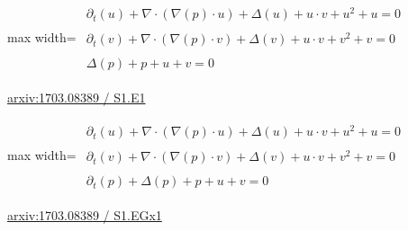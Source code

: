 \documentclass[UTF8,10pt,a4paper,fontset=mac]{ctexart}
\begin{document}
\begin{minipage}{\linewidth}\begin{center}\begin{adjustbox}{max width=\linewidth}$\displaystyle\begin{gathered}\begin{gathered}\partial_{t}(u)+\nabla\cdot(\nabla(p)\cdot u)+\Delta(u)+u\cdot v+u^{2}+u=0\end{gathered}\\[5pt]\begin{gathered}\partial_{t}(v)+\nabla\cdot(\nabla(p)\cdot v)+\Delta(v)+u\cdot v+v^{2}+v=0\end{gathered}\\[5pt]\begin{gathered}\Delta(p)+p+u+v=0\end{gathered}\end{gathered}$\end{adjustbox}\end{center}{\small\href{https://arxiv.org/html/1703.08389#S1.E1}{arxiv:1703.08389 / S1.E1}}\par\end{minipage}\par\vspace{6mm}

\begin{minipage}{\linewidth}\begin{center}\begin{adjustbox}{max width=\linewidth}$\displaystyle\begin{gathered}\begin{gathered}\partial_{t}(u)+\nabla\cdot(\nabla(p)\cdot u)+\Delta(u)+u\cdot v+u^{2}+u=0\end{gathered}\\[5pt]\begin{gathered}\partial_{t}(v)+\nabla\cdot(\nabla(p)\cdot v)+\Delta(v)+u\cdot v+v^{2}+v=0\end{gathered}\\[5pt]\begin{gathered}\partial_{t}(p)+\Delta(p)+p+u+v=0\end{gathered}\end{gathered}$\end{adjustbox}\end{center}{\small\href{https://arxiv.org/html/1703.08389#S1.EGx1}{arxiv:1703.08389 / S1.EGx1}}\par\end{minipage}\par\vspace{6mm}
\end{document}
